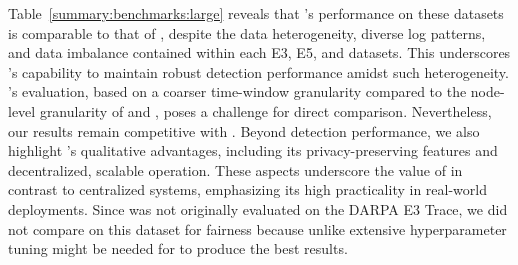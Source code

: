 Table~\ref{summary:benchmarks:large} reveals that \Sys's performance on these datasets is comparable to that of \flash, despite the data heterogeneity, diverse log patterns, and data imbalance contained within each E3, E5, and \optc datasets. This underscores \Sys's capability to maintain robust detection performance amidst such heterogeneity. \kairos's evaluation, based on a coarser time-window granularity compared to the node-level granularity of \flash and \Sys, poses a challenge for direct comparison. Nevertheless, our results remain competitive with \kairos. Beyond detection performance, we also highlight \Sys's qualitative advantages, including its privacy-preserving features and decentralized, scalable operation. These aspects underscore the value of \Sys in contrast to centralized systems, emphasizing its high practicality in real-world deployments. Since \kairos was not originally evaluated on the DARPA E3 Trace, we did not compare \kairos on this dataset for fairness because unlike \flash extensive hyperparameter tuning might be needed for \kairos to produce the best results.



